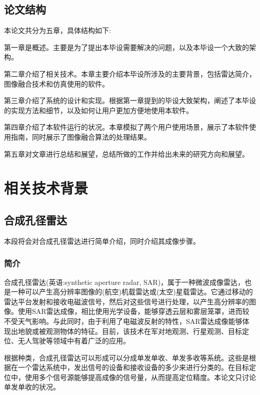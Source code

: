 \documentclass{xduugthesis}
\begin{document}
\section{论文结构}
本论文共分为五章，具体结构如下:\par
第一章是概述。主要是为了提出本毕设需要解决的问题，以及本毕设一个大致的架构。\par
第二章介绍了相关技术。本章主要介绍本毕设所涉及的主要背景，包括雷达简介，图像融合技术和仿真使用的软件。\par
第三章介绍了系统的设计和实现。根据第一章提到的毕设大致架构，阐述了本毕设的实现方法和细节，以及如何让用户更加方便地使用本软件。\par
第四章介绍了本软件运行的状况。本章模拟了两个用户使用场景，展示了本软件使用指南，同时展示了图像融合算法的处理结果。\par
第五章对文章进行总结和展望，总结所做的工作并给出未来的研究方向和展望。
\chapter{相关技术背景}
\section{合成孔径雷达}
本段将会对合成孔径雷达进行简单介绍，同时介绍其成像步骤。
\subsection{简介}
合成孔径雷达(英语:synthetic aperture radar, SAR)，属于一种微波成像雷达，也是一种可以产生高分辨率图像的(航空)机载雷达或(太空)星载雷达。它通过移动的雷达平台发射和接收电磁波信号，然后对这些信号进行处理，以产生高分辨率的图像。使用SAR雷达成像，相比使用光学设备，能够穿透云层和雾层笼罩，进而较不受天气影响。与此同时，由于利用了电磁波反射的特性，SAR雷达成像能够体现出地貌或被观测物体的特征。目前，该技术在军对地观测、行星观测、目标定位、无人驾驶等领域中有着广泛的应用。\par
根据种类，合成孔径雷达可以形成可以分成单发单收、单发多收等系统。这些是根据在一个雷达系统中，发出信号的设备和接收设备的多少来进行分类的。在目标定位中，使用多个信号源能够提高成像的信号量，从而提高定位精度。本论文只讨论单发单收的状况。
\end{document}
